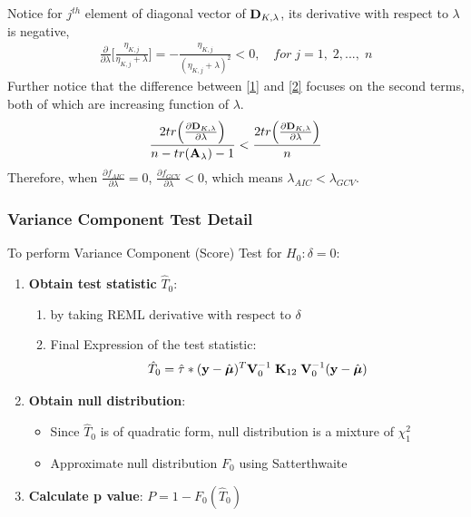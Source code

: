 \documentclass{beamer}
\begin{document}
\begin{frame}
Notice for $j^{th}$ element of diagonal vector of ${\bf D}_{K, \lambda}$, its derivative with respect to $\lambda$ is negative,
\begin{align*}
\frac{\partial }{\partial \lambda}\Big[\frac{\eta_{K, j}}{\eta_{K, j}+\lambda}\Big]=-\frac{\eta_{K, j}}{(\eta_{K, j}+\lambda)^2}<0, \quad for\; j=1,\;2,...,\;n
\end{align*}
Further notice that the difference between \eqref{1} and \eqref{2} focuses on the second terms, both of which are increasing function of $\lambda$.
\begin{align*}
\frac{2tr\Big(\frac{\partial {\bf D}_{K, \lambda}}{\partial \lambda}\Big)}{n-tr({\bf A}_\lambda)-1}<\frac{2tr\Big(\frac{\partial {\bf D}_{K, \lambda}}{\partial \lambda}\Big)}{n}
\end{align*}
Therefore, when $\frac{\partial f_{AIC}}{\partial \lambda}=0$, $\frac{\partial f_{GCV}}{\partial \lambda}<0$, which means $\lambda_{AIC}<\lambda_{GCV}$.\\
\hyperlink{lambda: aic_gcv}{}
\end{frame}


\begin{frame}
\frametitle{Variance Component Test Detail}
\label{vct_detail}
To perform Variance Component (Score) Test for $H_0: \delta = 0$:
\begin{enumerate}
\item \textbf{Obtain test statistic} $\hat{T}_0$:
\begin{enumerate}
\item by taking REML derivative with respect to $\delta$
\item Final Expression of the test statistic:
$$\hat{T}_0 = \hat{\tau} * ({\bf y} - \hat{\boldsymbol{\mu}})^T {\bf V}_0^{-1} \;  {\bf K}_{12} \; {\bf V}_0^{-1} ({\bf y} - \hat{\boldsymbol{\mu}})$$
\end{enumerate} 
\item \textbf{Obtain null distribution}:
\begin{itemize}
\item Since $\hat{T}_0$ is of quadratic form, null distribution is a mixture of $\chi^2_1$
\item Approximate null distribution $F_0$ using Satterthwaite
\end{itemize}
\item \textbf{Calculate p value}: $P = 1 - F_0(\hat{T}_0)$
\hyperlink{vct}{}
\end{enumerate}
\end{frame}
\end{document}
